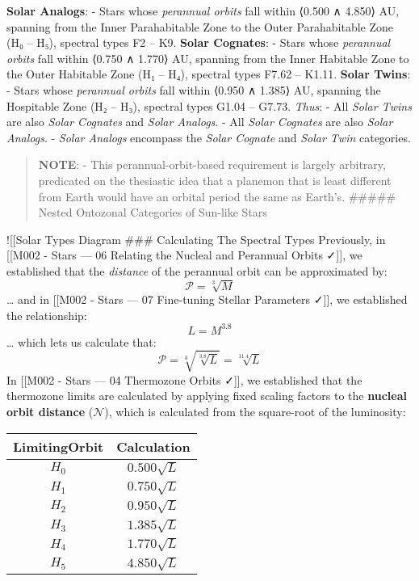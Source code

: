 \documentclass[
  letterpaper,
]{book}
\begin{document}
\textbf{Solar Analogs}: - Stars whose \emph{perannual orbits} fall
within ⟨0.500 ∧ 4.850⟩ AU, spanning from the Inner Parahabitable Zone to
the Outer Parahabitable Zone (H₀ -- H₅), spectral types F2 -- K9.
\textbf{Solar Cognates}: - Stars whose \emph{perannual orbits} fall
within ⟨0.750 ∧ 1.770⟩ AU, spanning from the Inner Habitable Zone to the
Outer Habitable Zone (H₁ -- H₄), spectral types F7.62 -- K1.11.
\textbf{Solar Twins}: - Stars whose \emph{perannual orbits} fall within
⟨0.950 ∧ 1.385⟩ AU, spanning the Hospitable Zone (H₂ -- H₃), spectral
types G1.04 -- G7.73. \emph{Thus}: - All \emph{Solar Twins} are also
\emph{Solar Cognates} and \emph{Solar Analogs}. - All \emph{Solar
Cognates} are also \emph{Solar Analogs}. - \emph{Solar Analogs}
encompass the \emph{Solar Cognate} and \emph{Solar Twin} categories.

\begin{quote}
\textbf{NOTE}: - This perannual-orbit-based requirement is largely
arbitrary, predicated on the thesiastic idea that a planemon that is
least different from Earth would have an orbital period the same as
Earth's. \#\#\#\#\# Nested Ontozonal Categories of Sun-like Stars
\end{quote}

!{[}{[}Solar Types Diagram\textbar300{]}{]} \#\#\# Calculating The
Spectral Types Previously, in {[}{[}M002 - Stars --- 06 Relating the
Nucleal and Perannual Orbits ✓{]}{]}, we established that the
\emph{distance} of the perannual orbit can be approximated by: \[
\mathcal{P} = \sqrt[3]{M}
\] \ldots{} and in {[}{[}M002 - Stars --- 07 Fine-tuning Stellar
Parameters ✓{]}{]}, we established the relationship: \[
L = M^{3.8}
\] \ldots{} which lets us calculate that: \[
\mathcal{P} = \sqrt[3]{\sqrt[3.8]{L}} = \sqrt[11.4]{L}
\] In {[}{[}M002 - Stars --- 04 Thermozone Orbits ✓{]}{]}, we
established that the thermozone limits are calculated by applying fixed
scaling factors to the \textbf{nucleal orbit distance}
(\(\mathcal{N}\)), which is calculated from the square-root of the
luminosity:

\begin{longtable}[]{@{}cc@{}}
\toprule\noalign{}
LimitingOrbit & Calculation \\
\midrule\noalign{}
\endhead
\bottomrule\noalign{}
\endlastfoot
\(H_0\) & \(0.500\sqrt{L}\) \\
\(H_1\) & \(0.750\sqrt{L}\) \\
\(H_2\) & \(0.950\sqrt{L}\) \\
\(H_3\) & \(1.385\sqrt{L}\) \\
\(H_4\) & \(1.770\sqrt{L}\) \\
\(H_5\) & \(4.850\sqrt{L}\) \\
\end{longtable}
\end{document}
